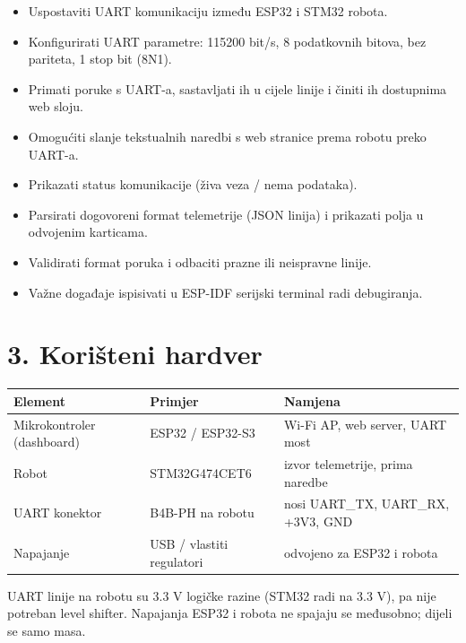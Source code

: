 \documentclass[10pt,a4paper]{article}
\begin{document}
\begin{itemize}
	\item Uspostaviti UART komunikaciju između ESP32 i STM32 robota.
	\item Konfigurirati UART parametre: 115200 bit/s, 8 podatkovnih bitova, bez pariteta, 1 stop bit (8N1).
	\item Primati poruke s UART-a, sastavljati ih u cijele linije i činiti ih dostupnima web sloju.
	\item Omogućiti slanje tekstualnih naredbi s web stranice prema robotu preko UART-a.
	\item Prikazati status komunikacije (živa veza / nema podataka).
	\item Parsirati dogovoreni format telemetrije (JSON linija) i prikazati polja u odvojenim karticama.
	\item Validirati format poruka i odbaciti prazne ili neispravne linije.
	\item Važne događaje ispisivati u ESP-IDF serijski terminal radi debugiranja.
\end{itemize}

\section*{3. Korišteni hardver}

\begin{table}[h!]
	\centering
	\begin{tabular}{@{}lll@{}}
		\toprule
		\textbf{Element}           & \textbf{Primjer}          & \textbf{Namjena}                   \\
		\midrule
		Mikrokontroler (dashboard) & ESP32 / ESP32-S3          & Wi-Fi AP, web server, UART most    \\
		Robot                      & STM32G474CET6             & izvor telemetrije, prima naredbe   \\
		UART konektor              & B4B-PH na robotu          & nosi UART\_TX, UART\_RX, +3V3, GND \\
		Napajanje                  & USB / vlastiti regulatori & odvojeno za ESP32 i robota         \\
		\bottomrule
	\end{tabular}
\end{table}

UART linije na robotu su 3.3 V logičke razine (STM32 radi na 3.3 V), pa nije potreban level shifter. Napajanja ESP32 i robota ne spajaju se međusobno; dijeli se samo masa.
\end{document}
